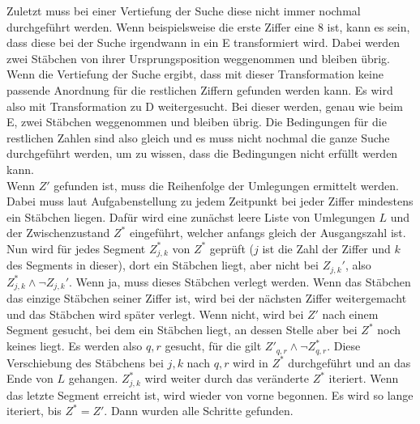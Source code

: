 \documentclass[a4paper,10pt,ngerman]{scrartcl}
\begin{document}
Zuletzt muss bei einer Vertiefung der Suche diese nicht immer nochmal durchgeführt werden. Wenn beispielsweise die erste Ziffer eine 8 ist, kann es sein, dass diese bei der Suche irgendwann in ein E transformiert wird. Dabei werden zwei Stäbchen von ihrer Ursprungsposition weggenommen und bleiben übrig. Wenn die Vertiefung der Suche ergibt, dass mit dieser Transformation keine passende Anordnung für die restlichen Ziffern gefunden werden kann. Es wird also mit Transformation zu D weitergesucht. Bei dieser werden, genau wie beim E, zwei Stäbchen weggenommen und bleiben übrig. Die Bedingungen für die restlichen Zahlen sind also gleich und es muss nicht nochmal die ganze Suche durchgeführt werden, um zu wissen, dass die Bedingungen nicht erfüllt werden kann. \\
Wenn $Z'$ gefunden ist, muss die Reihenfolge der Umlegungen ermittelt werden. Dabei muss laut Aufgabenstellung zu jedem Zeitpunkt bei jeder Ziffer mindestens ein Stäbchen liegen. Dafür wird eine zunächst leere Liste von Umlegungen $L$ und der Zwischenzustand $Z^*$ eingeführt, welcher anfangs gleich der Ausgangszahl ist. Nun wird für jedes Segment $Z_{j,k}^*$ von $Z^*$ geprüft ($j$ ist die Zahl der Ziffer und $k$ des Segments in dieser), dort ein Stäbchen liegt, aber nicht bei $Z_{j,k}'$, also $Z^*_{j,k} \land \neg Z_{j,k}'$. Wenn ja, muss dieses Stäbchen verlegt werden. Wenn das Stäbchen das einzige Stäbchen seiner Ziffer ist, wird bei der nächsten Ziffer weitergemacht und das Stäbchen wird später verlegt. Wenn nicht, wird bei $Z'$ nach einem Segment gesucht, bei dem ein Stäbchen liegt, an dessen Stelle aber bei $Z^*$ noch keines liegt. Es werden also $q,r$ gesucht, für die gilt $Z'_{q,r} \land \neg Z^*_{q,r}$. Diese Verschiebung des Stäbchens bei $j,k$ nach $q,r$ wird in $Z^*$ durchgeführt und an das Ende von $L$ gehangen. $Z_{j,k}^*$ wird weiter durch das veränderte $Z^*$ iteriert. Wenn das letzte Segment erreicht ist, wird wieder von vorne begonnen. Es wird so lange iteriert, bis $Z^*=Z'$. Dann wurden alle Schritte gefunden.
\end{document}
